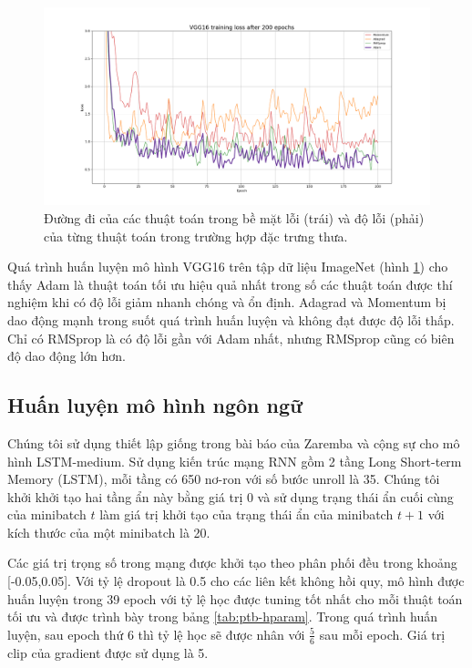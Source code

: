 \begin{figure}[htp]
	\centering
	\includegraphics[width=140 mm]{images/vgg16.png}
	\caption{Đường đi của các thuật toán trong bề mặt lỗi (trái) và độ lỗi (phải) của từng thuật toán trong trường hợp đặc trưng thưa.}
	\label{fig:vgg16-loss}
\end{figure}

Quá trình huấn luyện mô hình VGG16 trên tập dữ liệu ImageNet (hình \ref{fig:vgg16-loss}) cho thấy Adam là thuật toán tối ưu hiệu quả nhất trong số các thuật toán được thí nghiệm khi có độ lỗi giảm nhanh chóng và ổn định. Adagrad và Momentum bị dao động mạnh trong suốt quá trình huấn luyện và không đạt được độ lỗi thấp. Chỉ có RMSprop là có độ lỗi gần với Adam nhất, nhưng RMSprop cũng có biên độ dao động lớn hơn.

\subsection{Huấn luyện mô hình ngôn ngữ}
\label{exp:lstm}

Chúng tôi sử dụng thiết lập giống trong bài báo của Zaremba và cộng sự \cite{zaremba2014recurrent} cho mô hình LSTM-medium. Sử dụng kiến trúc mạng RNN gồm 2 tầng Long Short-term Memory (LSTM), mỗi tầng có 650 nơ-ron với số bước unroll là 35. Chúng tôi khởi khởi tạo hai tầng ẩn này bằng giá trị 0 và sử dụng trạng thái ẩn cuối cùng của minibatch $t$ làm giá trị khởi tạo của trạng thái ẩn của minibatch $t+1$ với kích thước của một minibatch là 20.

Các giá trị trọng số trong mạng được khởi tạo theo phân phối đều trong khoảng [-0.05,0.05]. Với tỷ lệ dropout là 0.5 cho các liên kết không hồi quy, mô hình được huấn luyện trong 39 epoch với tỷ lệ học được tuning tốt nhất cho mỗi thuật toán tối ưu và được trình bày trong bảng \ref{tab:ptb-hparam}. Trong quá trình huấn luyện, sau epoch thứ 6 thì tỷ lệ học sẽ được nhân với $\frac{5}{6}$ sau mỗi epoch. Giá trị clip của gradient được sử dụng là 5.

